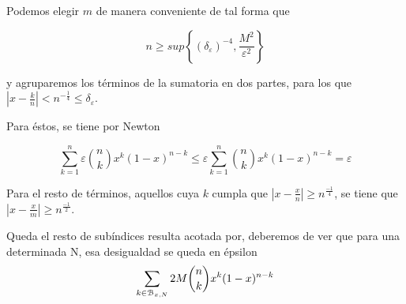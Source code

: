 Podemos elegir $m$ de manera conveniente de tal forma que 

$$ n \geq sup \left\{ (\delta_\varepsilon) ^{-4}, \frac{M^2}{\varepsilon^2}\right\}$$


y agruparemos los términos de la sumatoria en dos partes, para los que 
$|x - \frac{k}{n}| < n^{ -\frac{1}{4}} \leq \delta_\varepsilon$. 

Para éstos,  se tiene por Newton  

\begin{equation*}
    \sum_{k=1}^n   \varepsilon \binom{n}{k} x^k (1-x)^{n-k} \leq \varepsilon \sum_{k=1}^n \binom{n}{k} x^k (1-x)^{n-k} =  \varepsilon
\end{equation*}

Para el resto de términos, aquellos cuya $k$ cumpla que $|x - \frac{x}{n}| \geq n ^\frac{-1}{4}$, se tiene que 
$|x - \frac{x}{m}| \geq n ^\frac{-1}{2}$. 

Queda el resto de subíndices resulta acotada por, deberemos de ver que para una determinada N, 
esa desigualdad se queda en épsilon
\begin{equation*}
    \sum_{k \in \mathcal{B}_{x,N}} 2M \binom{n}{k} x^k (1-x) ^{n-k} \\
\end{equation*}
